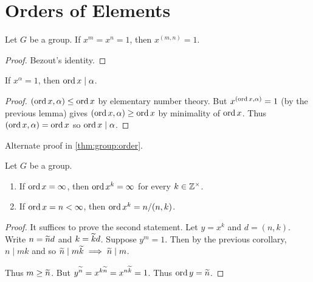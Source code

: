 \section{Orders of Elements} \label{sec:order}

\begin{lemma} \label{thm:order:bezout}
    Let $G$ be a group.
    If $x^m = x^n = 1$, then $x^{(m, n)} = 1$.
\end{lemma}
\begin{proof}
    Bezout's identity.
\end{proof}

\begin{corollary} \label{thm:order:divides}
    If $x^\alpha = 1$, then $\operatorname{ord} x \mid \alpha$.
\end{corollary}
\begin{proof}
    $(\operatorname{ord} x, \alpha) \le \operatorname{ord} x$ by elementary number theory.
    But $x^{(\operatorname{ord} x, \alpha)} = 1$ (by the previous lemma)
    gives $(\operatorname{ord} x, \alpha) \ge \operatorname{ord} x$ by minimality of $\operatorname{ord} x$.
    Thus $(\operatorname{ord} x, \alpha) = \operatorname{ord} x$ so $\operatorname{ord} x \mid \alpha$.
\end{proof}
Alternate proof in \cref{thm:group:order}.

\begin{lemma*} \label{thm:order:power}
    Let $G$ be a group.
    \begin{enumerate}
        \item If $\operatorname{ord} x = \infty$, then $\operatorname{ord} x^k = \infty$ for every
            $k \in \mathbb{Z}^\times$.
        \item If $\operatorname{ord} x = n < \infty$, then $\operatorname{ord} x^k = n / (n, k)$.
    \end{enumerate}
\end{lemma*}
\begin{proof}
    It suffices to prove the second statement. \TODO[How?] %
    Let $y = x^k$ and $d = (n, k)$.
    Write $n = \widetilde{n} d$ and $k = \widetilde{k} d$.
    Suppose $y^m = 1$.
    Then by the previous corollary, $n \mid mk$ and so
    $\widetilde{n} \mid m \widetilde{k} \implies \widetilde{n} \mid m$.

    Thus $m \ge \widetilde{n}$.
    But $y^{\widetilde{n}} = x^{k \widetilde{n}} = x^{n \widetilde{k}} = 1$.
    Thus $\operatorname{ord} y = \widetilde{n}$.
\end{proof}

